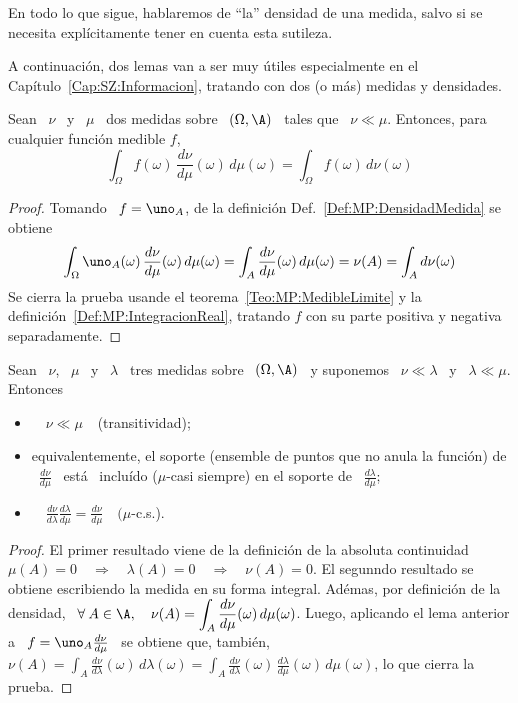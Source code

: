 En todo lo que  sigue, hablaremos de ``la'' densidad de una  medida, salvo si se
necesita expl\'icitamente tener en cuenta esta sutileza.

A  continuaci\'on,  dos  lemas  van  a  ser muy  \'utiles  especialmente  en  el
Cap\'itulo~\ref{Cap:SZ:Informacion},  tratando  con  dos  (o  m\'as)  medidas  y
densidades.
%
\begin{lema}
\label{Lem:RelacionIntegracionDerivadasRadon}
%
  Sean \  $\nu$ \ y \  $\mu$ \ dos medidas  sobre \ $(\Omega,\A)$ \  tales que \
  $\nu \ll \mu$. Entonces, para cualquier funci\'on medible $f$,
  \[
  \int_\Omega   f(\omega)  \,   \frac{d\nu}{d\mu}(\omega)   \,  d\mu(\omega)   =
  \int_\Omega f(\omega) \, d\nu(\omega)
  \]
\end{lema}
%
\begin{proof}
  Tomando \ $f =  \uno_A$, de la definici\'on Def.~\ref{Def:MP:DensidadMedida} se
  obtiene
  \[
  \int_\Omega  \uno_A(\omega)  \,  \frac{d\nu}{d\mu}(\omega)  \,  d\mu(\omega)  =
  \int_A   \frac{d\nu}{d\mu}(\omega)   \,  d\mu(\omega)   =   \nu(A)  =   \int_A
  d\nu(\omega)
  \]
  Se  cierra  la  prueba   usande  el  teorema~\ref{Teo:MP:MedibleLimite}  y  la
  definici\'on~\ref{Def:MP:IntegracionReal}, tratando $f$  con su parte positiva
  y negativa separadamente.
\end{proof}
%
\begin{lema}
\label{Lem:RelacionesDerivadasRadon}
%
  Sean \ $\nu$, \ $\mu$ \ y \ $\lambda$ \ tres medidas sobre \ $(\Omega,\A)$ \ y
  suponemos \ $\nu \ll \lambda$ \ y \ $\lambda \ll \mu$. Entonces
  \begin{itemize}
  \item $\quad \nu \ll \mu \:$ \ (transitividad);
  \item  equivalentemente,  el soporte  (ensemble  de  puntos  que no  anula  la
    funci\'on)  de \  $\displaystyle  \frac{d\nu}{d\mu}$ \  est\'a \  inclu\'ido
    ($\mu$-casi    siempre)    en     el    soporte    de    \    $\displaystyle
    \frac{d\lambda}{d\mu}$;
  \item  $\quad   \displaystyle  \frac{d\nu}{d\lambda}  \frac{d\lambda}{d\mu}  =
    \frac{d\nu}{d\mu} \quad (\mu$-c.s.).
\end{itemize}
\end{lema}
%
\begin{proof}
  El  primer resultado  viene  de  la definici\'on  de  la absoluta  continuidad
  $\mu(A) =  0 \quad  \Rightarrow \quad \lambda(A)  = 0 \quad  \Rightarrow \quad
  \nu(A) =  0$. El  segunndo resultado  se obtiene escribiendo  la medida  en su
  forma integral.   Ad\'emas, por definici\'on de la  densidad, \ $\displaystyle
  \forall  \: A  \in  \A,  \quad \nu(A)  =  \int_A \frac{d\nu}{d\mu}(\omega)  \,
  d\mu(\omega)$.   Luego,   aplicando  el   lema  anterior  a   \  $f   =  \uno_A
  \frac{d\nu}{d\mu}$  \ se  obtiene que,  tambi\'en, \  $\displaystyle  \nu(A) =
  \int_A    \frac{d\nu}{d\lambda}(\omega)   \,    d\lambda(\omega)    =   \int_A
  \frac{d\nu}{d\lambda}(\omega)      \,     \frac{d\lambda}{d\mu}(\omega)     \,
  d\mu(\omega)$, lo que cierra la prueba.
\end{proof}

